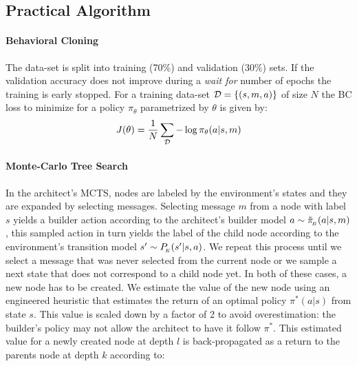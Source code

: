 \subsection{Practical Algorithm}
\label{ap:abig_algo}

\paragraph{Behavioral Cloning } 
The data-set is split into training (70\%) and validation (30\%) sets. If the validation accuracy does not improve during a \emph{wait for} number of epochs the training is early stopped. For a training data-set ${\mathcal{D}} = \{(s,m,a)\}$ of size $N$ the BC loss to minimize for a policy $\pi_\theta$ parametrized by $\theta$ is given by: 
\begin{equation}
    J(\theta) = \frac{1}{N}\sum_{{\mathcal{D}}}-\log\pi_\theta(a|s,m) 
\end{equation}

\paragraph{Monte-Carlo Tree Search }
In the architect's MCTS, nodes are labeled by the environment's states and they are expanded by selecting messages. Selecting message $m$ from a node with label $s$ yields a builder action according to the architect's builder model $a\sim \tilde{\pi}_{\!_B}(a|s,m)$, this sampled action in turn yields the label of the child node according to the environment's transition model $s'\sim P_{\!_E}(s'|s,a)$. We repeat this process until we select a message that was never selected from the current node or we sample a next state that does not correspond to a child node yet. In both of these cases, a new node has to be created. We estimate the value of the new node using an engineered heuristic that estimates the return of an optimal policy $\pi^*(a|s)$ from state $s$. This value is scaled down by a factor of 2 to avoid overestimation: the builder's policy may not allow the architect to have it follow $\pi^*$. This estimated value for a newly created node at depth $l$ is back-propagated as a return to the parents node at depth $k$ according to:

